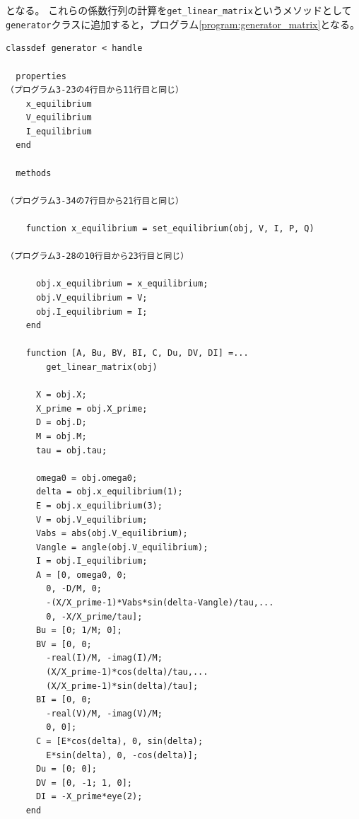 \documentclass[tombow,dvipdfmx]{corona-a5-1.1}
\begin{document}
\begin{例}[近似線形モデルの実装]
となる。
これらの係数行列の計算を\verb|get_linear_matrix|というメソッドとして\verb|generator|クラスに追加すると，プログラム\ref{program:generator_matrix}となる。

\smallskip
\begin{PROGRAMA}[count,title={generator.m}]\label{program:generator_matrix}
\begin{verbatim}
classdef generator < handle
  
  properties
（プログラム3-23の4行目から11行目と同じ）
    x_equilibrium
    V_equilibrium
    I_equilibrium
  end
  
  methods

（プログラム3-34の7行目から21行目と同じ）

    function x_equilibrium = set_equilibrium(obj, V, I, P, Q)

（プログラム3-28の10行目から23行目と同じ）

      obj.x_equilibrium = x_equilibrium;
      obj.V_equilibrium = V;
      obj.I_equilibrium = I;
    end
    
    function [A, Bu, BV, BI, C, Du, DV, DI] =...
        get_linear_matrix(obj)
      
      X = obj.X;
      X_prime = obj.X_prime;
      D = obj.D;
      M = obj.M;
      tau = obj.tau;
      
      omega0 = obj.omega0;
      delta = obj.x_equilibrium(1);
      E = obj.x_equilibrium(3);
      V = obj.V_equilibrium;
      Vabs = abs(obj.V_equilibrium);
      Vangle = angle(obj.V_equilibrium);
      I = obj.I_equilibrium;
      A = [0, omega0, 0;
        0, -D/M, 0;
        -(X/X_prime-1)*Vabs*sin(delta-Vangle)/tau,...
        0, -X/X_prime/tau];
      Bu = [0; 1/M; 0];
      BV = [0, 0;
        -real(I)/M, -imag(I)/M;
        (X/X_prime-1)*cos(delta)/tau,...
        (X/X_prime-1)*sin(delta)/tau];
      BI = [0, 0;
        -real(V)/M, -imag(V)/M;
        0, 0];
      C = [E*cos(delta), 0, sin(delta);
        E*sin(delta), 0, -cos(delta)];
      Du = [0; 0];
      DV = [0, -1; 1, 0];
      DI = -X_prime*eye(2);
    end


\end{verbatim}
\end{PROGRAMA}
\end{例}
\end{document}
